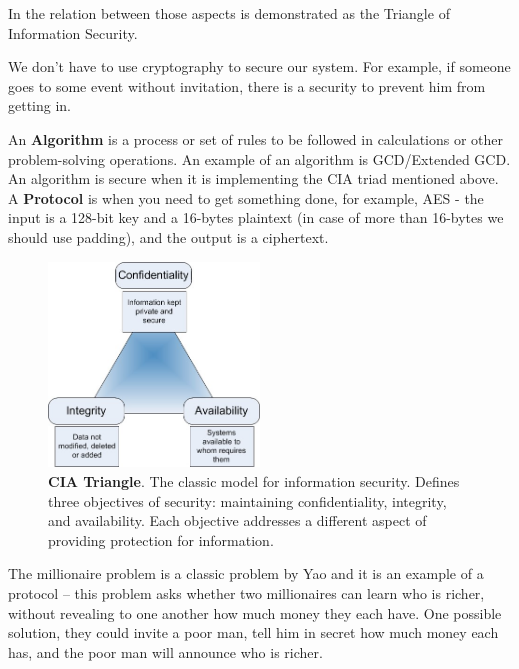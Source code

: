 In  the relation between those aspects is demonstrated as the Triangle of Information Security.

We don't have to use cryptography to secure our system. For example, if someone goes to some event without invitation, there is a security to prevent him from getting in.

An \textbf{Algorithm} is a process or set of rules to be followed in calculations or other problem-solving operations. An example of an algorithm is GCD/Extended GCD. An algorithm is secure when it is implementing the CIA triad mentioned above. A \textbf{Protocol} is when you need to get something done, for example, AES -  the input is a 128-bit key and a 16-bytes plaintext (in case of more than 16-bytes we should use padding), and the output is a ciphertext.

\begin{figure}
    \centering
    \includegraphics[width=0.5\textwidth]{images/ch1_Intro/cia.jpg}
    \caption{\textbf{CIA Triangle}. The classic model for information security. Defines three objectives of security: maintaining confidentiality, integrity, and availability. Each objective addresses a different aspect of providing protection for information.}
    \label{fig:CIA}
\end{figure}

The millionaire problem\cite{lin2005efficient} is a classic problem by Yao and it is an example of a protocol – this problem asks whether two millionaires can learn who is richer, without revealing to one another how much money they each have. One possible solution, they could invite a poor man, tell him in secret how much money each has, and the poor man will announce who is richer.  

